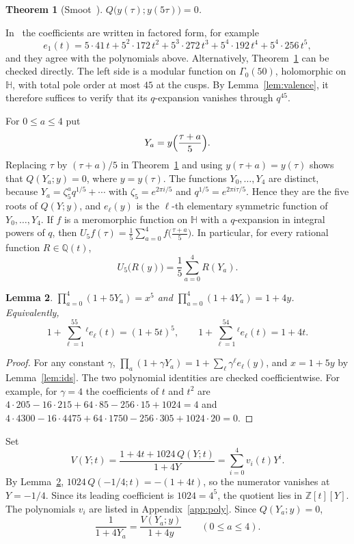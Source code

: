 \documentclass[11pt]{article}
\newtheorem{theorem}{Theorem}[section]
\newtheorem{lemma}[theorem]{Lemma}
\theoremstyle{definition}
\theoremstyle{remark}
\numberwithin{equation}{section}
\newcommand{\Z}{\mathbb{Z}}
\newcommand{\Q}{\mathbb{Q}}
\newcommand{\HH}{\mathbb{H}}
\begin{document}
\begin{theorem}[Smoot~{\cite[Theorem~2.4]{S}}]\label{thm:modeq}
$Q\bigl(y(\tau);y(5\tau)\bigr)=0$.
\end{theorem}

In~\cite{S} the coefficients are written in factored form, for example
\[
e_1(t)=5\cdot41\,t+5^2\cdot172\,t^2+5^3\cdot272\,t^3+5^4\cdot192\,t^4+5^4\cdot256\,t^5,
\]
and they agree with the polynomials above. Alternatively, Theorem~\ref{thm:modeq} can be checked directly. The left side is a modular function on $\Gamma_0(50)$, holomorphic on $\HH$, with total pole order at most $45$ at the cusps. By Lemma~\ref{lem:valence}, it therefore suffices to verify that its $q$-expansion vanishes through $q^{45}$.

For $0\le a\le4$ put
\[
Y_a=y\Bigl(\frac{\tau+a}{5}\Bigr).
\]
Replacing $\tau$ by $(\tau+a)/5$ in Theorem~\ref{thm:modeq} and using $y(\tau+a)=y(\tau)$ shows that $Q(Y_a;y)=0$, where $y=y(\tau)$. The functions $Y_0,\dots,Y_4$ are distinct, because $Y_a=\zeta_5^aq^{1/5}+\cdots$ with $\zeta_5=e^{2\pi i/5}$ and $q^{1/5}=e^{2\pi i\tau/5}$. Hence they are the five roots of $Q(Y;y)$, and $e_\ell(y)$ is the $\ell$-th elementary symmetric function of $Y_0,\dots,Y_4$. If $f$ is a meromorphic function on $\HH$ with a $q$-expansion in integral powers of $q$, then $U_5f(\tau)=\frac15\sum_{a=0}^4f\bigl(\frac{\tau+a}5\bigr)$. In particular, for every rational function $R\in\Q(t)$,
\begin{equation}\label{eq:U5R}
U_5\bigl(R(y)\bigr)=\frac15\sum_{a=0}^4R(Y_a).
\end{equation}

\begin{lemma}\label{lem:norms}
$\prod_{a=0}^4(1+5Y_a)=x^5$ and $\prod_{a=0}^4(1+4Y_a)=1+4y$. Equivalently,
\[
1+\sum_{\ell=1}^55^\ell e_\ell(t)=(1+5t)^5,\qquad 1+\sum_{\ell=1}^54^\ell e_\ell(t)=1+4t.
\]
\end{lemma}

\begin{proof}
For any constant $\gamma$, $\prod_a(1+\gamma Y_a)=1+\sum_\ell \gamma^\ell e_\ell(y)$, and $x=1+5y$ by Lemma~\ref{lem:ids}. The two polynomial identities are checked coefficientwise. For example, for $\gamma=4$ the coefficients of $t$ and $t^2$ are $4\cdot205-16\cdot215+64\cdot85-256\cdot15+1024=4$ and $4\cdot4300-16\cdot4475+64\cdot1750-256\cdot305+1024\cdot20=0$.
\end{proof}

Set
\begin{equation}\label{eq:V4}
V(Y;t)=\frac{1+4t+1024\,Q(Y;t)}{1+4Y}=\sum_{i=0}^4v_i(t)Y^i.
\end{equation}
By Lemma~\ref{lem:norms}, $1024\,Q(-1/4;t)=-(1+4t)$, so the numerator vanishes at $Y=-1/4$. Since its leading coefficient is $1024=4^5$, the quotient lies in $\Z[t][Y]$. The polynomials $v_i$ are listed in Appendix~\ref{app:poly}. Since $Q(Y_a;y)=0$,
\begin{equation}\label{eq:inv}
\frac{1}{1+4Y_a}=\frac{V(Y_a;y)}{1+4y}\qquad(0\le a\le4).
\end{equation}
\end{document}
